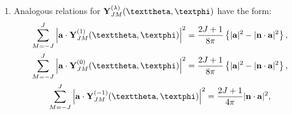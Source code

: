 \begin{enumerate}[label=(\alph*)]
\begin{align}
\sum_{M=-J}^{J}\left(\vect{a} \cdot \vect{Y}_{J M}^{J+1}(\vartheta, \varphi)\right)^{*}\left(\vect{a} \cdot \vect{Y}_{J M}^{J}(\vartheta, \varphi)\right)&=-i \frac{\sqrt{J(2 J+1)}}{8 \pi} \vect{n} \cdot\left[\vect{a}{ }^{*} \times \vect{a}\right], \label{eq:7:3:85}\\
\sum_{M=-J}^{J}\left(\vect{a} \cdot \vect{Y}_{J M}^{J+1}(\vartheta, \varphi)\right)^{*}\left(\vect{a} \cdot \vect{Y}_{J M}^{J-1}(\vartheta, \varphi)\right)&=\frac{\sqrt{J(J+1)}}{8 \pi}\left\{|\vect{a}|^{2}-3|\vect{n} \cdot \vect{a}|^{2}\right\}, \label{eq:7:3:86}\\
\sum_{M=-J}^{J}\left(\vect{a} \cdot \vect{Y}_{J M}^{J}(\vartheta, \varphi)\right)^{*}\left(\vect{a} \cdot \vect{Y}_{J M}^{J+1}(\vartheta, \varphi)\right)&=-i \frac{\sqrt{J(2 J+1)}}{8 \pi} \vect{n} \cdot\left[\vect{a}^{*} \times \vect{a}\right], \label{eq:7:3:87}\\
\sum_{M=-J}^{J}\left(\vect{a} \cdot \vect{Y}_{J M}^{J}(\vartheta, \varphi)\right)^{*}\left(\vect{a} \cdot \vect{Y}_{J M}^{J-1}(\vartheta, \varphi)\right)&=-i \frac{\sqrt{(J+1)(2 J+1)}}{8 \pi} \vect{n} \cdot\left[\vect{a}^{*} \times \vect{a}\right]. \label{eq:7:3:88}\\
 \sum_{M=-J}^{J}\left(\vect{a} \cdot \vect{Y}_{J M}^{J-1}(\vartheta, \varphi)\right)^{*}\left(\vect{a} \cdot \vect{Y}_{J M}^{J+1}(\vartheta, \varphi)\right)&=\frac{\sqrt{J(J+1)}}{8 \pi}\left\{|\vect{a}|^{2}-3|\vect{n} \cdot \vect{a}|^{2}\right\}, \label{eq:7:3:89}\\
 \sum_{M=-J}^{J}\left(\vect{a} \cdot \vect{Y}_{J M}^{J-1}(\vartheta, \varphi)\right)^{*}\left(\vect{a} \cdot \vect{Y}_{J M}^{J}(\vartheta, \varphi)\right)=&-i \frac{\sqrt{(J+1)(2 J+1)}}{8 \pi} \vect{n} \cdot\left[\vect{a}^{*} \times \vect{a}\right]. \label{eq:7:3:90}
\end{align}
\item Analogous relations for $\vect{Y}_{J M}^{(\lambda)}(\vartheta, \varphi)$ have the form:
\begin{gather}
\sum_{M=-J}^{J}\left|\vect{a} \cdot \vect{Y}_{J M}^{(1)}(\vartheta, \varphi)\right|^{2}=\frac{2 J+1}{8 \pi}\left\{|\vect{a}|^{2}-|\vect{n} \cdot \vect{a}|^{2}\right\}, \label{eq:7:3:91}\\
\sum_{M=-J}^{J}\left|\vect{a} \cdot \vect{Y}_{J M}^{(0)}(\vartheta, \varphi)\right|^{2}=\frac{2 J+1}{8 \pi}\left\{|\vect{a}|^{2}-|\vect{n} \cdot \vect{a}|^{2}\right\}, \label{eq:7:3:92}\\
\sum_{M=-J}^{J}\left|\vect{a} \cdot \vect{Y}_{J M}^{(-1)}(\vartheta, \varphi)\right|^{2}=\frac{2 J+1}{4 \pi}|\vect{n} \cdot \vect{a}|^{2}, \label{eq:7:3:93}\\

\end{gather}
\end{enumerate}
